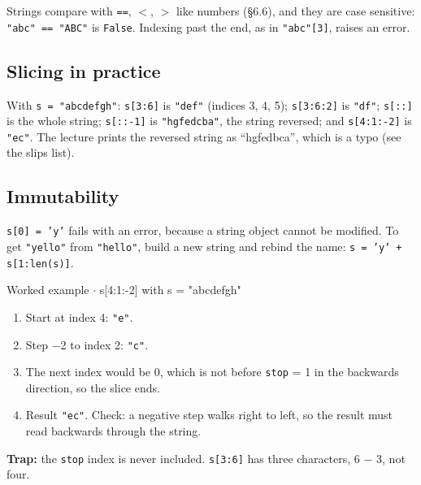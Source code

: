 \documentclass[11pt]{article}
\begin{document}
\begin{keepsection}
Strings compare with \texttt{==}, \texttt{\ensuremath{<}}, \texttt{\ensuremath{>}} like numbers (§6.6), and they are case sensitive: \texttt{"abc" == "ABC"} is \texttt{False}. Indexing past the end, as in \texttt{"abc"[3]}, raises an error.

\begin{keepsection}
\subsection{Slicing in practice}

With \texttt{s = "abcdefgh"}: \texttt{s[3:6]} is \texttt{"def"} (indices 3, 4, 5); \texttt{s[3:6:2]} is \texttt{"df"}; \texttt{s[::]} is the whole string; \texttt{s[::-1]} is \texttt{"hgfedcba"}, the string reversed; and \texttt{s[4:1:-2]} is \texttt{"ec"}. The lecture prints the reversed string as “hgfedbca”, which is a typo (see the slips list).
\end{keepsection}

\begin{keepsection}
\subsection{Immutability}

\texttt{s[0] = 'y'} fails with an error, because a string object cannot be modified. To get \texttt{"yello"} from \texttt{"hello"}, build a new string and rebind the name: \texttt{s = 'y' + s[1:len(s)]}.

\begin{workedbox}{Worked example \ensuremath{\cdot} s[4:1:-2] with s = "abcdefgh"}
\begin{enumerate}
\item Start at index 4: \texttt{"e"}.
\item Step \ensuremath{-}2 to index 2: \texttt{"c"}.
\item The next index would be 0, which is not before \texttt{stop} = 1 in the backwards direction, so the slice ends.
\item Result \texttt{"ec"}. Check: a negative step walks right to left, so the result must read backwards through the string.
\end{enumerate}
\end{workedbox}

\begin{notebox}\textbf{Trap:} the \texttt{stop} index is never included. \texttt{s[3:6]} has three characters, 6 \ensuremath{-} 3, not four.\end{notebox}


\end{keepsection}
\end{keepsection}
\end{document}
